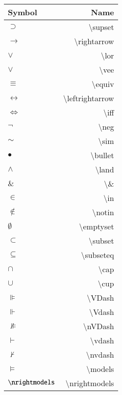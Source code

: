 \documentclass[12pt]{article}
\begin{document}
\\
\begin{multicols}{2}
\Large

  \begin{tabular}{| l | r | }
    \hline
    Symbol & Name \\ \hline
    $\supset$ & \textbackslash supset \\ \hline
    $\rightarrow$ & \textbackslash rightarrow \\ \hline
	$\lor$ & \textbackslash lor \\ \hline
	$\vee$ & \textbackslash vee \\ \hline
	$\equiv$ & \textbackslash equiv \\ \hline
	$\leftrightarrow$ & \textbackslash leftrightarrow \\ \hline
	$\iff$ & \textbackslash iff \\ \hline
	$\neg$ & \textbackslash neg \\ \hline
	$\sim$ & \textbackslash sim \\ \hline
	$\bullet$ & \textbackslash bullet \\ \hline
	$\land$ & \textbackslash land \\ \hline
	$\&$ & \textbackslash \& \\ \hline
	$\in$ & \textbackslash in \\ \hline
	$\notin$ & \textbackslash notin \\ \hline
	$\emptyset$ & \textbackslash emptyset \\ \hline
	$\subset$ & \textbackslash subset \\ \hline
	$\subseteq$ & \textbackslash subseteq \\ \hline
	$\cap$ & \textbackslash cap \\ \hline
	$\cup$ & \textbackslash cup \\ \hline
	$\VDash$ & \textbackslash VDash \\ \hline
	$\Vdash$ & \textbackslash Vdash \\ \hline
	$\nVDash$ & \textbackslash nVDash \\ \hline
	$\vdash$ & \textbackslash vdash \\ \hline
	$\nvdash$ & \textbackslash nvdash \\ \hline	
	$\models$ & \textbackslash models \\ \hline
	$\nrightmodels$ & \textbackslash nrightmodels \\ \hline
    \hline
  \end{tabular}



\end{multicols}
\end{document}
